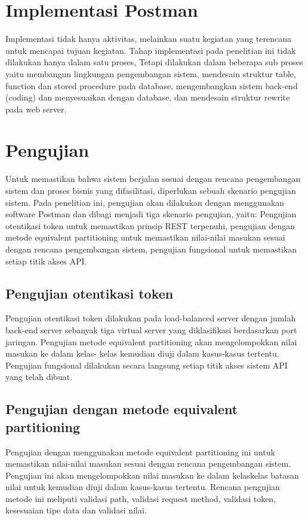\documentclass[12pt,a4paper]{article}
\begin{document}
\section{Implementasi Postman}
Implementasi tidak hanya aktivitas, melainkan suatu kegiatan yang terencana untuk mencapai
tujuan kegiatan. Tahap implementasi pada penelitian ini tidak dilakukan hanya dalam satu proses,
Tetapi dilakukan dalam beberapa sub proses yaitu membangun lingkungan pengembangan sistem, 
mendesain struktur table, function dan stored procedure pada database, mengembangkan sistem back-end (coding) 
dan menyesuaikan dengan database, dan mendesain struktur rewrite pada web server. 

\section{Pengujian}
Untuk memastikan bahwa sistem berjalan sesuai dengan rencana pengembangan sistem dan proses bisnis yang difasilitasi, diperlukan sebuah skenario pengujian sistem. Pada penelitian ini, pengujian akan dilakukan dengan menggunakan software Postman dan dibagi menjadi tiga skenario pengujian, yaitu: Pengujian otentikasi token untuk memastikan prinsip REST terpenuhi, pengujian dengan metode equivalent partitioning untuk memastikan nilai-nilai masukan sesuai dengan rencana pengembangan sistem, pengujian fungsional untuk memastikan setiap titik akses API.

\subsection{Pengujian otentikasi token}
Pengujian  otentikasi token dilakukan pada load-balanced server dengan jumlah back-end server sebanyak tiga virtual server yang diklasifikasi berdasarkan port jaringan. Pengujian  metode equivalent partitioning akan mengelompokkan nilai masukan ke dalam kelas- kelas kemudian diuji dalam kasus-kasus tertentu. Pengujian fungsional dilakukan secara langsung setiap titik akses sistem API yang telah dibuat. 

\subsection {Pengujian dengan metode equivalent partitioning}
Pengujian dengan menggunakan metode equivalent partitioning ini untuk memastikan nilai-nilai masukan sesuai dengan rencana pengembangan sistem. Pengujian ini akan mengelompokkan nilai masukan ke dalam kelaskelas batasan nilai untuk kemudian diuji dalam kasus-kasus tertentu. Rencana pengujian metode ini meliputi validasi path, validasi request method, validasi token, kesesuaian tipe data dan validasi nilai.
\end{document}
